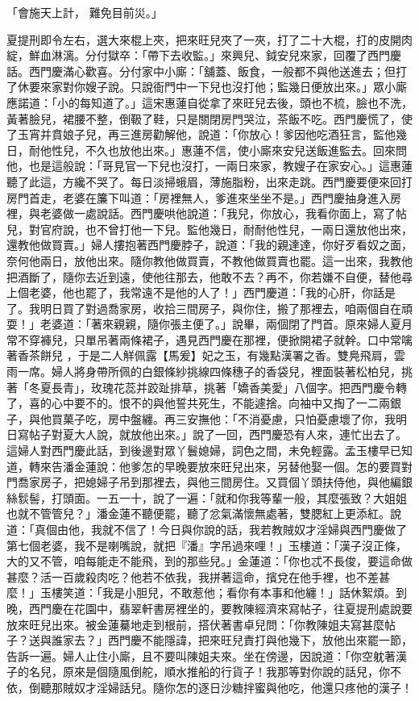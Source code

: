 \begin{showcontents}{}
「會施天上計，  難免目前災。」

夏提刑即令左右，選大來棍上夾，把來旺兒夾了一夾，打了二十大棍，打的皮開肉綻，鮮血淋漓。分付獄卒：「帶下去收監。」來興兒、鉞安兒來家，回覆了西門慶話。西門慶滿心歡喜。分付家中小廝：「舖蓋、飯食，一般都不與他送進去；但打了休要來家對你嫂子說。只說衙門中一下兒也沒打他；監幾日便放出來。」眾小廝應諾道：「小的每知道了。」這宋惠蓮自從拿了來旺兒去後，頭也不梳，臉也不洗，黃著臉兒，裙腰不整，倒靸了鞋，只是關閉房門哭泣，茶飯不吃。西門慶慌了，使了玉宵并賁娘子兒，再三進房勸解他，說道：「你放心！爹因他吃酒狂言，監他幾日，耐他性兒，不久也放他出來。」惠蓮不信，使小廝來安兒送飯進監去。回來問他，也是這般說：「哥見官一下兒也沒打，一兩日來家，教嫂子在家安心。」這惠蓮聽了此這，方纔不哭了。每日淡掃蛾眉，薄施脂粉，出來走跳。西門慶要便來回打房門首走，老婆在簾下叫道：「房裡無人，爹進來坐坐不是。」西門慶抽身進入房裡，與老婆做一處說話。西門慶哄他說道：「我兒，你放心，我看你面上，寫了帖兒，對官府說，也不曾打他一下兒。監他幾日，耐耐他性兒，一兩日還放他出來，還教他做買賣。」婦人摟抱著西門慶脖子，說道：「我的親達達，你好歹看奴之面，奈何他兩日，放他出來。隨你教他做買賣，不教他做買賣也罷。這一出來，我教他把酒斷了，隨你去近到遠，使他往那去，他敢不去？再不，你若嫌不自便，替他尋上個老婆，他也罷了，我常遠不是他的人了！」西門慶道：「我的心肝，你話是了。我明日買了對過喬家房，收拾三間房子，與你住，搬了那裡去，咱兩個自在頑耍！」老婆道：「著來親親，隨你張主便了。」說畢，兩個閉了門首。原來婦人夏月常不穿褲兒，只單吊著兩條裙子，遇見西門慶在那裡，便掀開裙子就幹。口中常噙著香茶餅兒 ，于是二人觧佩露【馬爰】妃之玉，有幾點漢署之香。雙鳧飛肩，雲雨一席。婦人將身帶所佩的白銀條紗挑線四條穗子的香袋兒，裡面裝著松柏兒，挑著「冬夏長青」，玫瑰花蕊并跤趾排草，挑著「嬌香美愛」八個字。把西門慶令轉了，喜的心中要不的。恨不的與他誓共死生，不能遽捨。向袖中又掏了一二兩銀子，與他買菓子吃，房中盤纏。再三安撫他：「不消憂慮，只怕憂慮壞了你，我明日寫帖子對夏大人說，就放他出來。」說了一回，西門慶恐有人來，連忙出去了。這婦人對西門慶此話，到後邊對眾丫鬟媳婦，詞色之間，未免輕露。孟玉樓早已知道，轉來告潘金蓮說：他爹怎的早晚要放來旺兒出來，另替他娶一個。怎的要買對門喬家房子，把媳婦子吊到那裡去，與他三間房住。又買個丫頭扶侍他，與他編銀絲䯼髻，打頭面。一五一十，說了一遍：「就和你我等輩一般，其麼張致？大姐姐也就不管管兒？」潘金蓮不聽便罷，聽了忿氣滿懷無處著，雙腮紅上更添紅。說道：「真個由他，我就不信了！今日與你說的話，我若教賊奴才淫婦與西門慶做了第七個老婆，我不是喇嘴說，就把『潘』字吊過來哩！」玉樓道：「漢子沒正條，大的又不管，咱每能走不能飛，到的那些兒。」金蓮道：「你也忒不長俊，要這命做甚麼？活一百歲殺肉吃？他若不依我，我拼著這命，擯兌在他手裡，也不差甚麼！」玉樓笑道：「我是小胆兒，不敢惹他；看你有本事和他纏！」話休絮煩。到晚，西門慶在花園中，翡翠軒書房裡坐的，要教陳經濟來寫帖子，往夏提刑處說要放來旺兒出來。被金蓮驀地走到根前，搭伏著書卓兒問：「你教陳姐夫寫甚麼帖子？送與誰家去？」西門慶不能隱諱，把來旺兒責打與他幾下，放他出來罷一節，告訴一遍。婦人止住小廝，且不要叫陳姐夫來。坐在傍邊，因說道：「你空躭著漢子的名兒，原來是個隨風倒舵，順水推船的行貨子！我那等對你說的話兒，你不依，倒聽那賊奴才淫婦話兒。隨你怎的逐日沙糖拌蜜與他吃，他還只疼他的漢子！
\end{showcontents}
